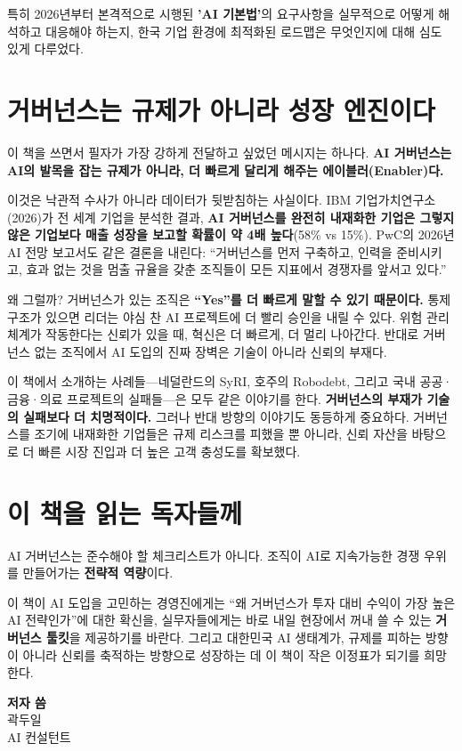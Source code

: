 특히 2026년부터 본격적으로 시행된 \textbf{'AI 기본법'}의 요구사항을 실무적으로 어떻게 해석하고 대응해야 하는지, 한국 기업 환경에 최적화된 로드맵은 무엇인지에 대해 심도 있게 다루었다.

\section*{거버넌스는 규제가 아니라 성장 엔진이다}

이 책을 쓰면서 필자가 가장 강하게 전달하고 싶었던 메시지는 하나다. \textbf{AI 거버넌스는 AI의 발목을 잡는 규제가 아니라, 더 빠르게 달리게 해주는 에이블러(Enabler)다.}

이것은 낙관적 수사가 아니라 데이터가 뒷받침하는 사실이다. IBM 기업가치연구소(2026)가 전 세계 기업을 분석한 결과, \textbf{AI 거버넌스를 완전히 내재화한 기업은 그렇지 않은 기업보다 매출 성장을 보고할 확률이 약 4배 높다}(58\% vs 15\%). PwC의 2026년 AI 전망 보고서도 같은 결론을 내린다: ``거버넌스를 먼저 구축하고, 인력을 준비시키고, 효과 없는 것을 멈출 규율을 갖춘 조직들이 모든 지표에서 경쟁자를 앞서고 있다.''\cite{pwc2026aivalue}

왜 그럴까? 거버넌스가 있는 조직은 \textbf{``Yes''를 더 빠르게 말할 수 있기 때문이다.} 통제 구조가 있으면 리더는 야심 찬 AI 프로젝트에 더 빨리 승인을 내릴 수 있다. 위험 관리 체계가 작동한다는 신뢰가 있을 때, 혁신은 더 빠르게, 더 멀리 나아간다. 반대로 거버넌스 없는 조직에서 AI 도입의 진짜 장벽은 기술이 아니라 신뢰의 부재다.

이 책에서 소개하는 사례들---네덜란드의 SyRI, 호주의 Robodebt, 그리고 국내 공공·금융·의료 프로젝트의 실패들---은 모두 같은 이야기를 한다. \textbf{거버넌스의 부재가 기술의 실패보다 더 치명적이다.} 그러나 반대 방향의 이야기도 동등하게 중요하다. 거버넌스를 조기에 내재화한 기업들은 규제 리스크를 피했을 뿐 아니라, 신뢰 자산을 바탕으로 더 빠른 시장 진입과 더 높은 고객 충성도를 확보했다.

\section*{이 책을 읽는 독자들께}

AI 거버넌스는 준수해야 할 체크리스트가 아니다. 조직이 AI로 지속가능한 경쟁 우위를 만들어가는 \textbf{전략적 역량}이다.

이 책이 AI 도입을 고민하는 경영진에게는 ``왜 거버넌스가 투자 대비 수익이 가장 높은 AI 전략인가''에 대한 확신을, 실무자들에게는 바로 내일 현장에서 꺼내 쓸 수 있는 \textbf{거버넌스 툴킷}을 제공하기를 바란다. 그리고 대한민국 AI 생태계가, 규제를 피하는 방향이 아니라 신뢰를 축적하는 방향으로 성장하는 데 이 책이 작은 이정표가 되기를 희망한다.

\vspace{2cm}
\begin{flushright}
\textbf{저자 씀} \\[0.3em]
곽두일 \\
AI 컨설턴트
\end{flushright}
